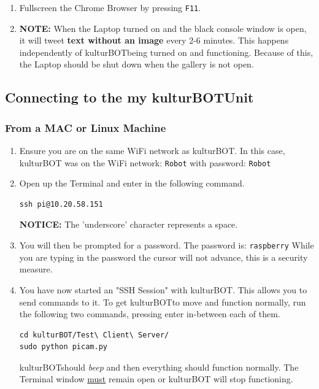 \documentclass[]{article}
\newcommand{\kb}{kulturBOT}
\newcommand{\kbspace}{\kb \space}
\newcommand{\mykb}{my \kb}
\newcommand{\mykbspace}{\mykb \space}
\begin{document}
\begin{enumerate}
		\item Fullscreen the Chrome Browser by pressing \texttt{F11}.
		
		\item \textbf{NOTE:} When the Laptop turned on and the black console window is open, it will tweet \textbf{text without an image} every 2-6 minutes. This happens independently of \kbspace being turned on and functioning. Because of this, the Laptop should be shut down when the gallery is not open.
\end{enumerate}

\subsection{Connecting to the \mykbspace Unit}

\subsubsection{From a MAC or Linux Machine}

\begin{enumerate}
\item Ensure you are on the same WiFi network as \kb. In this case, kulturBOT was on the WiFi network: \texttt{Robot} with password: \texttt{Robot}
\item Open up the Terminal and enter in the following command.\\

\begin{lstlisting}[style=ssh]
ssh pi@10.20.58.151
\end{lstlisting}

\textbf{NOTICE:} The 'underscore' character represents a space.

\item You will then be prompted for a password. The password is: \texttt{raspberry} While you are typing in the password the cursor will not advance, this is a security measure.

\item You have now started an "SSH Session" with \kb. This allows you to send commands to it. To get \kbspace to move and function normally, run the following two commands, pressing enter in-between each of them.\\

\begin{lstlisting}[style=ssh]
cd kulturBOT/Test\ Client\ Server/
sudo python picam.py
\end{lstlisting}

\kbspace should \textit{beep} and then everything should function normally. The Terminal window \underline{must} remain open or kulturBOT will stop functioning.

\end{enumerate}
\end{document}
